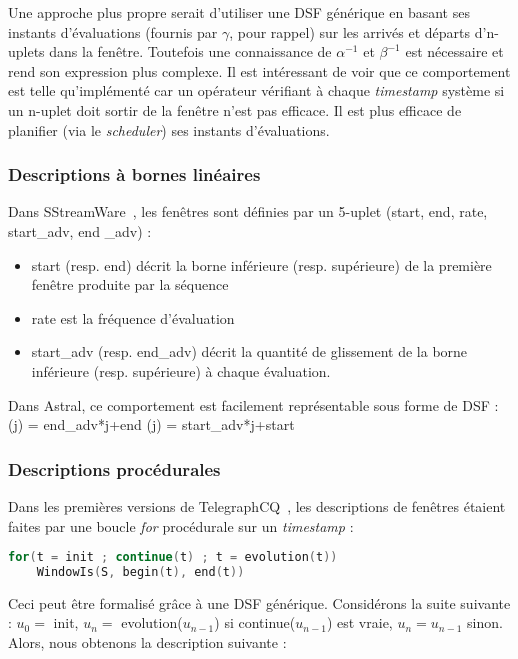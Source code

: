 Une approche plus propre serait d'utiliser une DSF générique en basant ses instants d'évaluations (fournis par $\gamma$, pour rappel) sur les arrivés et départs d'n-uplets dans la fenêtre. Toutefois une connaissance de $\alpha^{-1}$ et $\beta^{-1}$ est nécessaire et rend son expression plus complexe. Il est intéressant de voir que ce comportement est telle qu'implémenté car un opérateur vérifiant à chaque \textit{timestamp} système si un n-uplet doit sortir de la fenêtre n'est pas efficace. Il est plus efficace de planifier (via le \textit{scheduler}) ses instants d'évaluations.

\subsubsection{Descriptions à bornes linéaires}
Dans SStreamWare~\cite{Gurgen:sstreamware}, les fenêtres sont définies par un 5-uplet (start, end, rate, start\_adv, end \_adv) :
\begin{itemize}
	\item start (resp. end) décrit la borne inférieure (resp. supérieure) de la première fenêtre produite par la séquence
	\item rate est la fréquence d'évaluation
	\item start\_adv (resp. end\_adv) décrit la quantité de glissement de la borne inférieure (resp. supérieure) à chaque évaluation.
\end{itemize}

Dans Astral, ce comportement est facilement représentable sous forme de DSF :
	{\beta(j) = \textrm{end\_adv}*j+\textrm{end}}
	{\alpha(j) = \textrm{start\_adv}*j+\textrm{start}}

\subsubsection{Descriptions procédurales}
Dans les premières versions de TelegraphCQ~\cite{Chandrasekaran:telegraphcq}, les descriptions de fenêtres étaient faites par une boucle \textit{for} procédurale sur un \textit{timestamp} :
\begin{lstlisting}[language=C]
for(t = init ; continue(t) ; t = evolution(t))
	WindowIs(S, begin(t), end(t))
\end{lstlisting}

Ceci peut être formalisé grâce à une DSF générique. Considérons la suite suivante : $u_0=$ init, $u_n=$ evolution($u_{n-1}$) si continue($u_{n-1}$) est vraie, $u_n = u_{n-1}$ sinon. Alors, nous obtenons la description suivante :

